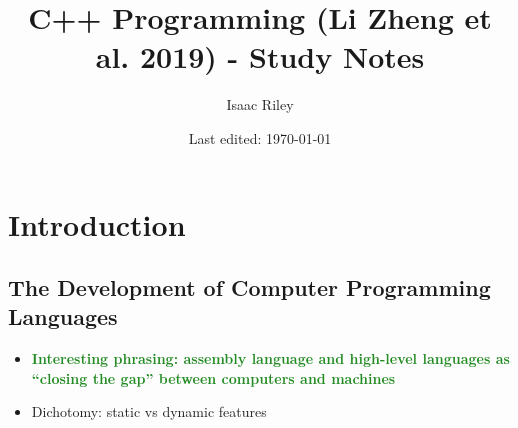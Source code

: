 \documentclass[a4paper]{article}
\title{C++ Programming (Li Zheng et al. 2019) - Study Notes}
\author{Isaac Riley}
\date{Last edited: \today}
\newcommand{\obs}[1]{\textcolor{ForestGreen}{\textbf{#1}}}
\begin{document}
\maketitle
\tableofcontents
\newpage







\newpage
\section{Introduction}
\subsection{The Development of Computer Programming Languages}
\begin{itemize}
    \item \obs{Interesting phrasing: assembly language and high-level languages as ``closing the gap'' between computers and machines}
    \item Dichotomy: static vs dynamic features
\end{itemize}

\end{document}
